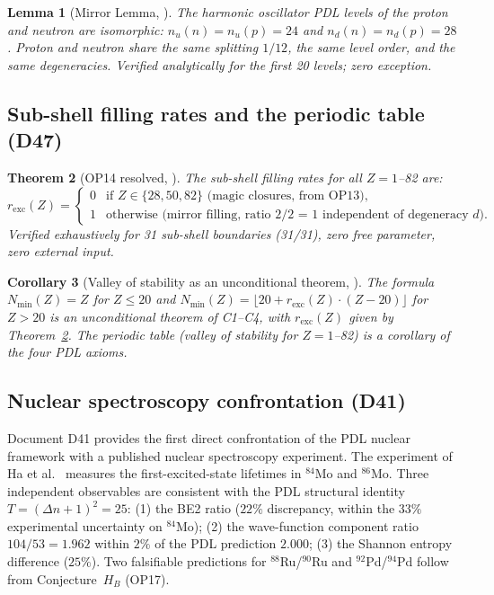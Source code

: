 \documentclass[11pt,a4paper]{article}
\theoremstyle{plain}
\newtheorem{theorem}{Theorem}[section]
\newtheorem{corollary}[theorem]{Corollary}
\newtheorem{lemma}[theorem]{Lemma}
\theoremstyle{definition}
\theoremstyle{remark}
\begin{document}
\begin{lemma}[Mirror Lemma, \cite{D47}]
\label{lem:mirror}
The harmonic oscillator PDL levels of the proton and neutron are isomorphic: $n_u(n) = n_u(p) = 24$ and $n_d(n) = n_d(p) = 28$. Proton and neutron share the same splitting $1/12$, the same level order, and the same degeneracies. Verified analytically for the first 20 levels; zero exception.
\end{lemma}

\subsection{Sub-shell filling rates and the periodic table (D47)}
\label{subsec:fillingrates}
\begin{theorem}[OP14 resolved, \cite{D47}]
\label{thm:fillingrates}
The sub-shell filling rates for all $Z = 1$--82 are:
\begin{equation}
r_{\mathrm{exc}}(Z) = \begin{cases} 0 & \text{if } Z \in \{28, 50, 82\} \text{ (magic closures, from OP13)},\\ 1 & \text{otherwise (mirror filling, ratio 2/2 = 1 independent of degeneracy } d). \end{cases}
\end{equation}
Verified exhaustively for 31 sub-shell boundaries (31/31), zero free parameter, zero external input.
\end{theorem}

\begin{corollary}[Valley of stability as an unconditional theorem, \cite{D47}]
\label{cor:valley}
The formula $N_{\min}(Z) = Z$ for $Z \leq 20$ and $N_{\min}(Z) = \lfloor 20 + r_{\mathrm{exc}}(Z)\cdot(Z-20)\rfloor$ for $Z > 20$ is an unconditional theorem of C1--C4, with $r_{\mathrm{exc}}(Z)$ given by Theorem~\ref{thm:fillingrates}. The periodic table (valley of stability for $Z=1$--82) is a corollary of the four PDL axioms.
\end{corollary}

\subsection{Nuclear spectroscopy confrontation (D41)}
\label{subsec:d41}
Document D41 provides the first direct confrontation of the PDL nuclear framework with a published nuclear spectroscopy experiment. The experiment of Ha et al.~\cite{Ha2025} measures the first-excited-state lifetimes in $^{84}$Mo and $^{86}$Mo. Three independent observables are consistent with the PDL structural identity $T=(\Delta n+1)^2=25$: (1) the BE2 ratio ($22\%$ discrepancy, within the $33\%$ experimental uncertainty on $^{84}$Mo); (2) the wave-function component ratio $104/53 = 1.962$ within $2\%$ of the PDL prediction $2.000$; (3) the Shannon entropy difference ($25\%$). Two falsifiable predictions for $^{88}$Ru/$^{90}$Ru and $^{92}$Pd/$^{94}$Pd follow from Conjecture~$H_B$ (OP17).
\end{document}
